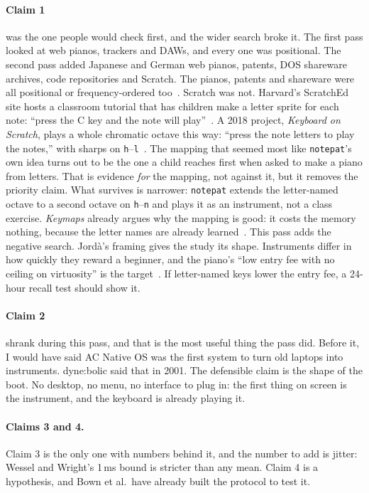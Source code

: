 \documentclass[10pt,letterpaper,twocolumn]{article}
\newcommand{\acos}{AC Native OS}
\newcommand{\np}{\texttt{notepat}}
\newcommand{\key}[1]{\texttt{#1}}
\begin{document}
\paragraph{Claim 1} was the one people would check first, and the wider search broke it. The first pass looked at web pianos, trackers and DAWs, and every one was positional. The second pass added Japanese and German web pianos, patents, DOS shareware archives, code repositories and Scratch. The pianos, patents and shareware were all positional or frequency-ordered too~\citep{patent6444888}. Scratch was not. Harvard's ScratchEd site hosts a classroom tutorial that has children make a letter sprite for each note: ``press the C key and the note will play''~\citep{sienna_scratchpiano}. A 2018 project, \emph{Keyboard on Scratch}, plays a whole chromatic octave this way: ``press the note letters to play the notes,'' with sharps on \key{h}--\key{l}~\citep{persam2018scratch}. The mapping that seemed most like \np{}'s own idea turns out to be the one a child reaches first when asked to make a piano from letters. That is evidence \emph{for} the mapping, not against it, but it removes the priority claim. What survives is narrower: \np{} extends the letter-named octave to a second octave on \key{h}--\key{n} and plays it as an instrument, not a class exercise. \emph{Keymaps} already argues why the mapping is good: it costs the memory nothing, because the letter names are already learned~\citep{scudder2026keymaps}. This pass adds the negative search. Jordà's framing gives the study its shape. Instruments differ in how quickly they reward a beginner, and the piano's ``low entry fee with no ceiling on virtuosity'' is the target~\citep{jorda2004efficiency,wessel2002problems}. If letter-named keys lower the entry fee, a 24-hour recall test should show it.

\paragraph{Claim 2} shrank during this pass, and that is the most useful thing the pass did. Before it, I would have said \acos{} was the first system to turn old laptops into instruments. dyne:bolic said that in 2001. The defensible claim is the shape of the boot. No desktop, no menu, no interface to plug in: the first thing on screen is the instrument, and the keyboard is already playing it.

\paragraph{Claims 3 and 4.} Claim 3 is the only one with numbers behind it, and the number to add is jitter: Wessel and Wright's 1\,ms bound is stricter than any mean. Claim 4 is a hypothesis, and Bown et al.\ have already built the protocol to test it.
\end{document}
